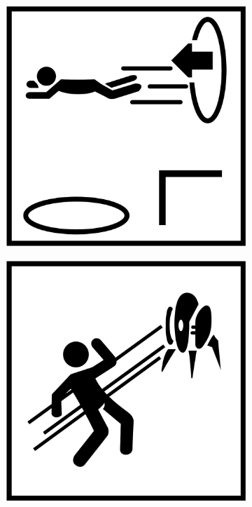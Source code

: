 \begin{figure}[H]
  \vspace{1mm}
  
  \begin{subfigure}[l]{0.195\linewidth}
    \includegraphics[width=\textwidth]{Sources/PortalIcons/6.jpg}
  \end{subfigure}
  \begin{subfigure}[l]{0.195\linewidth}
    \includegraphics[width=\textwidth]{Sources/PortalIcons/7.jpg}

\end{subfigure}
\end{figure}
